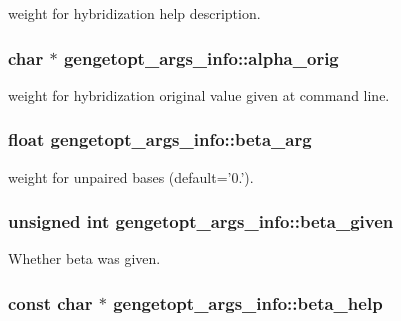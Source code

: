 weight for hybridization help description. 

\hypertarget{structgengetopt__args__info_a764f3e0a251f142ad756912a7f8e43a2}{
\subsubsection[{alpha\+\_\+orig}]{\setlength{\rightskip}{0pt plus 5cm}char $\ast$ gengetopt\+\_\+args\+\_\+info\+::alpha\+\_\+orig}}\label{structgengetopt__args__info_a764f3e0a251f142ad756912a7f8e43a2}


weight for hybridization original value given at command line. 

\hypertarget{structgengetopt__args__info_af10d11b97a09ce5f90816f475f099383}{
\subsubsection[{beta\+\_\+arg}]{\setlength{\rightskip}{0pt plus 5cm}float gengetopt\+\_\+args\+\_\+info\+::beta\+\_\+arg}}\label{structgengetopt__args__info_af10d11b97a09ce5f90816f475f099383}


weight for unpaired bases (default='0.'). 

\hypertarget{structgengetopt__args__info_a78fbc9190ccaddb0718c66b5ea3f16d1}{
\subsubsection[{beta\+\_\+given}]{\setlength{\rightskip}{0pt plus 5cm}unsigned int gengetopt\+\_\+args\+\_\+info\+::beta\+\_\+given}}\label{structgengetopt__args__info_a78fbc9190ccaddb0718c66b5ea3f16d1}


Whether beta was given. 

\hypertarget{structgengetopt__args__info_a4a10c9f1eac9e95ee84071c2c42924ac}{
\subsubsection[{beta\+\_\+help}]{\setlength{\rightskip}{0pt plus 5cm}const char $\ast$ gengetopt\+\_\+args\+\_\+info\+::beta\+\_\+help}}\label{structgengetopt__args__info_a4a10c9f1eac9e95ee84071c2c42924ac}


